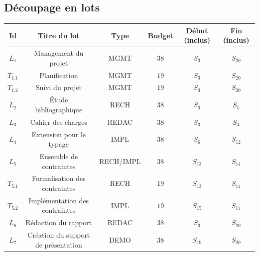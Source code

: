 \documentclass[a4paper]{article}
\begin{document}
\subsection{Découpage en lots}
\begin{center}
\begin{tabular}{c|c|c|c|c|c}
	Id & Titre du lot & Type & Budget & Début (inclus) & Fin (inclus) \\
	\hline
	\hline
	$L_1$ & Management du projet & MGMT & $38$ & $S_3$ & $S_{20}$ \\
	\hline
	$T_{1.1}$ & Planification & MGMT & $19$ & $S_3$ & $S_{20}$ \\
	\hline
	$T_{1.2}$ & Suivi du projet & MGMT & $19$ & $S_3$ & $S_{20}$ \\
	\hline
	$L_2$ & Étude bibliographique & RECH & $38$ & $S_3$ & $S_5$ \\
	\hline
	$L_3$ & Cahier des charges & REDAC & $38$ & $S_3$ & $S_4$ \\
	\hline
	$L_4$ & Extension pour le typage & IMPL & $38$ & $S_6$ & $S_{12}$ \\
	\hline
	$L_5$ & Ensemble de contraintes & RECH/IMPL & $38$ & $S_{13}$ & $S_{14}$ \\
	\hline
	$T_{5.1}$ & Formalisation des contraintes & RECH & $19$ & $S_{13}$ & $S_{14}$ \\
	\hline
	$T_{5.2}$ & Implémentation des contraintes & IMPL & $19$ & $S_{15}$ & $S_{17}$ \\
	\hline
	$L_6$ & Rédaction du rapport & REDAC & $38$ & $S_3$ & $S_{20}$ \\
	\hline
	$L_7$ & Création du support de présentation & DEMO & $38$ & $S_{19}$ & $S_{20}$ \\
\end{tabular}
\end{center}
\end{document}
